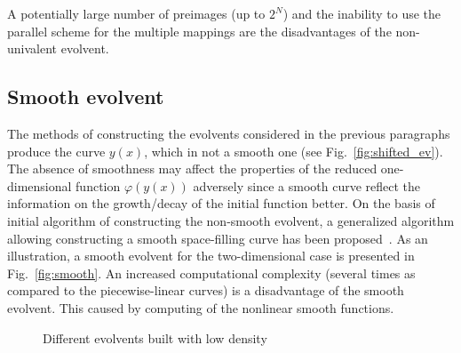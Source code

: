 \documentclass[3p,times,procedia]{elsarticle}
\begin{document}
A potentially large number of preimages (up to $2^N$) and the inability to use the parallel
scheme for the multiple mappings are the disadvantages of the non-univalent evolvent.

\subsection{Smooth evolvent}

The methods of constructing the evolvents considered in the previous paragraphs produce the
curve $y(x)$, which in not a smooth one (see Fig.~\ref{fig:shifted_ev}). The absence of
smoothness may affect the properties of the reduced one-dimensional function $\varphi(y(x))$
adversely since a smooth curve reflect the information on the growth/decay of the initial
function better. On the basis of initial algorithm of constructing the non-smooth evolvent, a
generalized algorithm allowing constructing a smooth space-filling curve has been
proposed~\cite{Goryachih2017}. As an illustration, a smooth evolvent for the two-dimensional
case is presented in Fig.~\ref{fig:smooth}.
An increased computational complexity (several times as compared to the piecewise-linear
curves) is a disadvantage of the smooth evolvent. This caused by computing of the nonlinear smooth
functions.

\begin{figure}[ht]
    \centering
    \caption{Different evolvents built with low density}
\end{figure}
\end{document}
